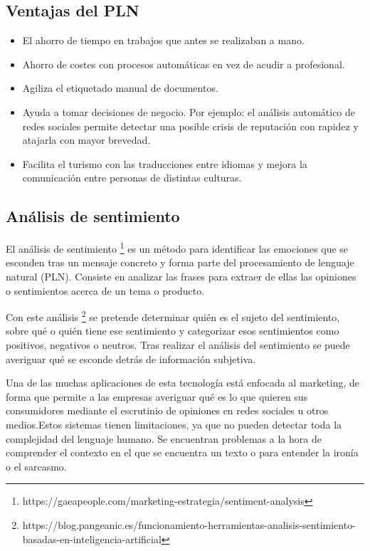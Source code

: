 \subsection{Ventajas del PLN}

\begin{itemize}
	\item El ahorro de tiempo en trabajos que antes se realizaban a mano.
	\item Ahorro de costes con procesos automáticas en vez de acudir a profesional.
	\item Agiliza el etiquetado manual de documentos.
	\item Ayuda a tomar decisiones de negocio. Por ejemplo: el análisis automático de redes sociales permite detectar una posible crisis de reputación con rapidez y atajarla con mayor brevedad.
	\item Facilita el turismo con las traducciones entre idiomas y mejora la comunicación entre personas de distintas culturas.
\end{itemize}

\subsection{Análisis de sentimiento} \label{sentiment}

El análisis de sentimiento \footnote{https://gaeapeople.com/marketing-estrategia/sentiment-analysis} es un método para identificar las emociones que se esconden tras un mensaje concreto y forma parte del procesamiento de lenguaje natural (PLN). Consiste en analizar las frases para extraer de ellas las opiniones o sentimientos acerca de un tema o producto.

Con este análisis \footnote{https://blog.pangeanic.es/funcionamiento-herramientas-analisis-sentimiento-basadas-en-inteligencia-artificial} se pretende determinar quién es el sujeto del sentimiento, sobre qué o quién tiene ese sentimiento y categorizar esos sentimientos como positivos, negativos o neutros. Tras realizar el análisis del sentimiento se puede averiguar qué se esconde detrás de información subjetiva.

Una de las muchas aplicaciones de esta tecnología está enfocada al marketing, de forma que permite a las empresas averiguar qué es lo que quieren sus consumidores mediante el escrutinio de opiniones en redes sociales u otros medios.Estos sistemas tienen limitaciones, ya que no pueden detectar toda la complejidad del lenguaje humano. Se encuentran problemas a la hora de comprender el contexto en el que se encuentra un texto o para entender la ironía o el sarcasmo.

